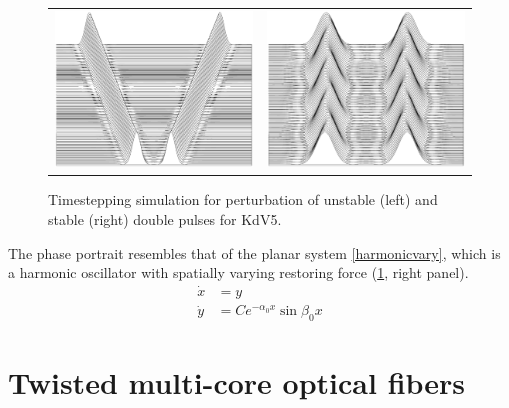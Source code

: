 \documentclass[12pt,reqno,oneside]{article}
\theoremstyle{definition}
\theoremstyle{remark}
\begin{document}
\begin{figure}[H]
\begin{center}
\begin{tabular}{cc}
\includegraphics[width=7cm]{images/waterfallunstable.eps}  &
\includegraphics[width=7cm]{images/waterfallstable.eps}
\end{tabular}
\end{center}
\caption{Timestepping simulation for perturbation of unstable (left) and stable (right) double pulses for KdV5.}
\label{fig:KdV5timestep}
\end{figure}
The phase portrait resembles that of the planar system \eqref{harmonicvary}, which is a harmonic oscillator with spatially varying restoring force (\cref{fig:KdV5timestep}, right panel).
\begin{equation}\label{harmonicvary}
\begin{aligned}
\dot{x} &= y \\
\dot{y} &= C e^{-\alpha_0 x} \sin \beta_0 x
\end{aligned}
\end{equation} 

\section{Twisted multi-core optical fibers}
\end{document}
